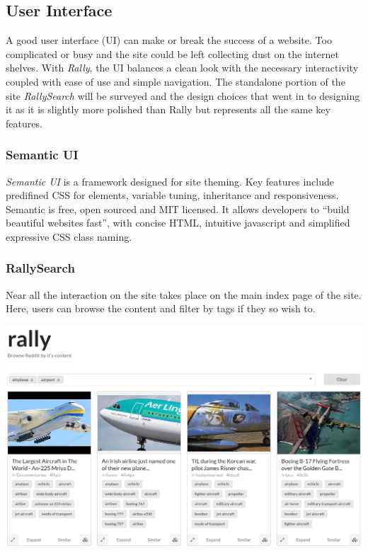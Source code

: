 \documentclass[msc,oneside]{ubcthesis}%
\begin{document}
\subsection{User Interface}
A good user interface (UI) can make or break the success of a website. Too complicated or busy and the site could be left collecting dust on the internet shelves. With \textit{Rally}, the UI balances a clean look with the necessary interactivity coupled with ease of use and simple navigation. The standalone portion of the site \textit{RallySearch} will be surveyed and the design choices that went in to designing it as it is slightly more polished than Rally but represents all the same key features.
\subsubsection{Semantic UI}
\textit{Semantic UI} is a framework designed for site theming. Key features include predifined CSS for elements, variable tuning, inheritance and responsiveness. Semantic is free, open sourced and MIT licensed. It allows developers to ``build beautiful websites fast'', with concise HTML, intuitive javascript and simplified expressive CSS class naming.
\subsubsection{RallySearch}
Near all the interaction on the site takes place on the main index page of the site. Here, users can browse the content and filter by tags if they so wish to.

\includegraphics[width=\textwidth]{rallyindexpage.png}
\end{document}
